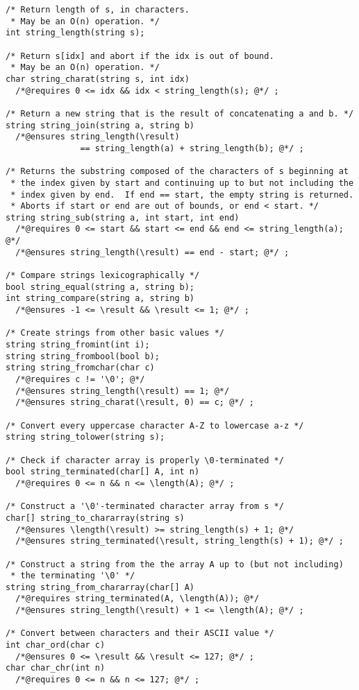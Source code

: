 \documentclass[11pt]{article}
\begin{document}
\begin{small}
\begin{verbatim}
/* Return length of s, in characters.
 * May be an O(n) operation. */
int string_length(string s);  
         
/* Return s[idx] and abort if the idx is out of bound.
 * May be an O(n) operation. */
char string_charat(string s, int idx)
  /*@requires 0 <= idx && idx < string_length(s); @*/ ;

/* Return a new string that is the result of concatenating a and b. */
string string_join(string a, string b)
  /*@ensures string_length(\result) 
               == string_length(a) + string_length(b); @*/ ;

/* Returns the substring composed of the characters of s beginning at
 * the index given by start and continuing up to but not including the
 * index given by end.  If end == start, the empty string is returned.
 * Aborts if start or end are out of bounds, or end < start. */
string string_sub(string a, int start, int end)
  /*@requires 0 <= start && start <= end && end <= string_length(a); @*/
  /*@ensures string_length(\result) == end - start; @*/ ;

/* Compare strings lexicographically */
bool string_equal(string a, string b);
int string_compare(string a, string b)
  /*@ensures -1 <= \result && \result <= 1; @*/ ;

/* Create strings from other basic values */
string string_fromint(int i);
string string_frombool(bool b);
string string_fromchar(char c)
  /*@requires c != '\0'; @*/
  /*@ensures string_length(\result) == 1; @*/ 
  /*@ensures string_charat(\result, 0) == c; @*/ ;

/* Convert every uppercase character A-Z to lowercase a-z */
string string_tolower(string s);

/* Check if character array is properly \0-terminated */
bool string_terminated(char[] A, int n)
  /*@requires 0 <= n && n <= \length(A); @*/ ;

/* Construct a '\0'-terminated character array from s */
char[] string_to_chararray(string s)
  /*@ensures \length(\result) >= string_length(s) + 1; @*/
  /*@ensures string_terminated(\result, string_length(s) + 1); @*/ ;

/* Construct a string from the the array A up to (but not including)
 * the terminating '\0' */
string string_from_chararray(char[] A)
  /*@requires string_terminated(A, \length(A)); @*/
  /*@ensures string_length(\result) + 1 <= \length(A); @*/ ;

/* Convert between characters and their ASCII value */
int char_ord(char c)
  /*@ensures 0 <= \result && \result <= 127; @*/ ;
char char_chr(int n)
  /*@requires 0 <= n && n <= 127; @*/ ;
\end{verbatim}
\end{small}
\end{document}
